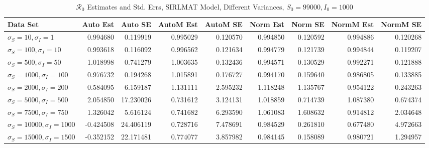 \documentclass[12pt]{article}
\newcommand{\rr}{\ensuremath{\mathcal{R}_0}}
\begin{document}
\begin{table}[H]
	
	\caption{$\rr$ Estimates and Std. Errs, SIRLMAT Model,
		Different Variances, 
		$S_0 = 99000, I_0 = 1000$}
	\begin{footnotesize}
		\hskip -1.7cm
	\begin{tabular}{l|r|r|r|r|r|r|r|r}
		\hline
		Data Set & Auto Est & Auto SE & AutoM Est & AutoM SE & Norm Est & Norm SE & NormM Est & NormM SE\\
		\hline
		$\sigma_S = 10, \sigma_I = 1$ & 0.994680 & 0.119919 & 0.995029 & 0.120570 & 0.994850 & 0.120592 & 0.994886 & 0.120268\\
		\hline
		$\sigma_S = 100, \sigma_I = 10$ & 0.993618 & 0.116092 & 0.996562 & 0.121634 & 0.994779 & 0.121739 & 0.994844 & 0.119207\\
		\hline
		$\sigma_S = 500, \sigma_I = 50$ & 1.018998 & 0.741279 & 1.003635 & 0.132436 & 0.994571 & 0.130529 & 0.992271 & 0.121888\\
		\hline
		$\sigma_S = 1000, \sigma_I = 100$ & 0.976732 & 0.194268 & 1.015891 & 0.176727 & 0.994170 & 0.159640 & 0.986805 & 0.133885\\
		\hline
		$\sigma_S = 2000, \sigma_I = 200$ & 0.584095 & 6.159187 & 1.131111 & 2.595232 & 1.118248 & 1.135767 & 0.954122 & 0.243263\\
		\hline
		$\sigma_S = 5000, \sigma_I = 500$ & 2.054850 & 17.230026 & 0.731612 & 3.124131 & 1.018859 & 0.714739 & 1.087380 & 0.674374\\
		\hline
		$\sigma_S = 7500, \sigma_I = 750$ & 1.326042 & 5.616124 & 0.741682 & 6.293590 & 1.061083 & 1.608632 & 0.914812 & 2.034648\\
		\hline
		$\sigma_S = 10000, \sigma_I = 1000$ & -0.424508 & 24.406119 & 0.728716 & 7.478691 & 0.984529 & 0.261810 & 0.677480 & 4.972663\\
		\hline
		$\sigma_S = 15000, \sigma_I = 1500$ & -0.352152 & 22.171481 & 0.774077 & 3.857982 & 0.984145 & 0.158089 & 0.980721 & 1.294957\\
		\hline
	\end{tabular}
\end{footnotesize}
\end{table}
\end{document}
